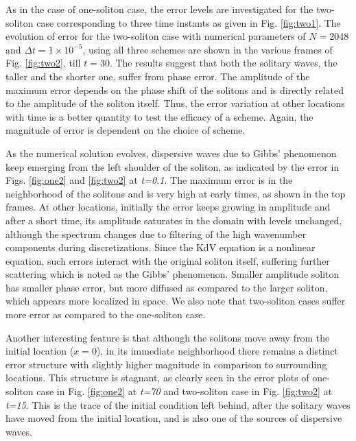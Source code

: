 \documentclass{svjour3}                    %
\begin{document}
As in the case of one-soliton case, the error levels are investigated for the two-soliton case corresponding to three time instants as given in Fig. \ref{fig:two1}.
The evolution of error for the two-soliton case with numerical parameters of $N=2048$ and $\Delta t = 1 \times 10^{-5}$, using 
all three schemes are shown in the various frames of Fig. \ref{fig:two2}, till $t=30$. The results suggest that both the solitary waves, 
the taller and the shorter one, suffer from phase error. The amplitude of the maximum error depends on the phase shift of the solitons and is directly related to the amplitude of the soliton itself. Thus, the error variation at other locations with time is a better quantity to test the efficacy of a scheme. Again, the magnitude of error is dependent on the choice of scheme.

As the numerical solution evolves, dispersive waves due to Gibbs' phenomenon keep emerging from the left shoulder of the soliton, as indicated by the 
error in Figs. \ref{fig:one2} and \ref{fig:two2} at \emph{t=0.1}. The maximum error is in the neighborhood 
of the solitons and is very high at early times, as shown in the top frames. At other locations, initially 
the error keeps growing in amplitude and after a short time, its amplitude saturates in the domain with levels unchanged, although the spectrum changes 
due to filtering of the high wavenumber components during discretizations. Since the KdV equation is a nonlinear equation, such errors interact with the 
original soliton itself, suffering further scattering which is noted as the Gibbs' phenomenon. Smaller amplitude soliton has smaller phase error, but 
more diffused as compared to the larger soliton, which appears more localized in space. We also note that two-soliton cases suffer more error as compared to the one-soliton case.

Another interesting feature is that although the solitons move away from the initial location ($x=0$), in its immediate neighborhood there remains a distinct error structure with slightly higher magnitude in comparison to surrounding locations. This structure is stagnant, as clearly seen in the 
error plots of one-soliton case in Fig. \ref{fig:one2} at \emph{t=70} and two-soliton case in Fig. \ref{fig:two2} at \emph{t=15}. This is the trace of the initial condition left behind, 
after the solitary waves have moved from the initial location, and is also one of the sources of dispersive waves.
\end{document}
